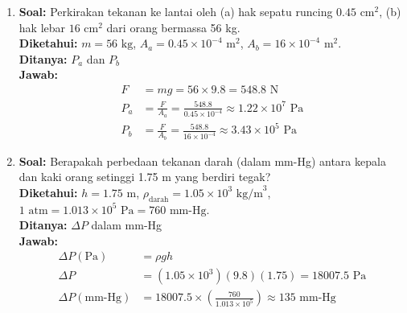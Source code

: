 \documentclass[twocolumn]{article}
\begin{document}
\begin{enumerate}
    \item \textbf{Soal:} Perkirakan tekanan ke lantai oleh (a) hak sepatu runcing $0.45 \text{ cm}^2$, (b) hak lebar $16 \text{ cm}^2$ dari orang bermassa 56 kg. \\
    \textbf{Diketahui:} $m = 56 \text{ kg}$, $A_a = 0.45 \times 10^{-4} \text{ m}^2$, $A_b = 16 \times 10^{-4} \text{ m}^2$. \\
    \textbf{Ditanya:} $P_a$ dan $P_b$ \\
    \textbf{Jawab:}
    \begin{align*}
        F &= mg = 56 \times 9.8 = 548.8 \text{ N} \\
        P_a &= \frac{F}{A_a} = \frac{548.8}{0.45 \times 10^{-4}} \approx 1.22 \times 10^7 \text{ Pa} \\
        P_b &= \frac{F}{A_b} = \frac{548.8}{16 \times 10^{-4}} \approx 3.43 \times 10^5 \text{ Pa}
    \end{align*}

    \item \textbf{Soal:} Berapakah perbedaan tekanan darah (dalam mm-Hg) antara kepala dan kaki orang setinggi 1.75 m yang berdiri tegak? \\
    \textbf{Diketahui:} $h = 1.75 \text{ m}$, $\rho_{\text{darah}} = 1.05 \times 10^3 \text{ kg/m}^3$, $1 \text{ atm} = 1.013 \times 10^5 \text{ Pa} = 760 \text{ mm-Hg}$. \\
    \textbf{Ditanya:} $\Delta P$ dalam mm-Hg \\
    \textbf{Jawab:}
    \begin{align*}
        \Delta P (\text{Pa}) &= \rho g h \\
        \Delta P &= (1.05 \times 10^3)(9.8)(1.75) = 18007.5 \text{ Pa} \\
        \Delta P (\text{mm-Hg}) &= 18007.5 \times \left( \frac{760}{1.013 \times 10^5} \right) \approx 135 \text{ mm-Hg}
    \end{align*}


\end{enumerate}
\end{document}
